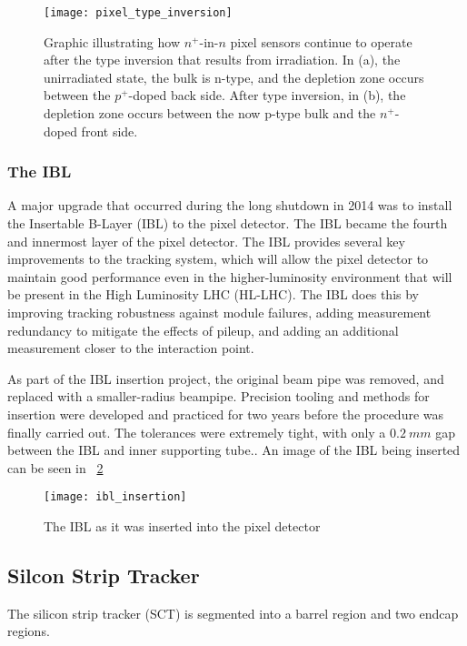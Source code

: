 \begin{figure}[h]
\texttt{[image: pixel\_type\_inversion]}
\caption{Graphic illustrating how $n^+$-in-$n$ pixel sensors continue
  to operate after the type inversion that results from
  irradiation. In (a), the unirradiated state, the bulk is n-type, and
the depletion zone occurs between the $p^+$-doped back side. After
type inversion, in (b), the depletion zone occurs between the now
p-type bulk and the $n^+$-doped front side.\cite{pixels-2008}}
\label{fig:pixel_type_inversion}
\end{figure}

\subsubsection{The IBL}
A major upgrade that occurred during the long shutdown in 2014 was to
install the Insertable B-Layer (IBL) to the pixel detector. The IBL became
the fourth and innermost layer of the pixel detector. The IBL provides
several key improvements to the tracking system, which will allow the
pixel detector to maintain good performance even in the
higher-luminosity environment that will be present in the High
Luminosity LHC (HL-LHC).\cite{ibl-tdr} The IBL does this by
improving tracking robustness against module failures, adding
measurement redundancy to mitigate the effects of pileup, and
adding an additional measurement closer to the interaction
point. \cite{ibl-tdr}

As part of the IBL insertion project, the original beam pipe was
removed, and replaced with a smaller-radius beampipe. Precision
tooling and methods for insertion were developed and practiced for two
years before the procedure was finally carried out. The tolerances
were extremely tight, with only a $0.2~mm$ gap between the IBL and
inner supporting tube.\cite{ibl-website}. An image of the IBL being inserted can be seen in
~\ref{fig:ibl_insertion}

\begin{figure}[h]
\texttt{[image: ibl\_insertion]}
\caption{The IBL as it was inserted into the pixel detector}
\label{fig:ibl_insertion}
\cite{ibl-website}
\end{figure}

\subsection{Silcon Strip Tracker}

The silicon strip tracker (SCT) is segmented into a barrel region and
two endcap regions. 

